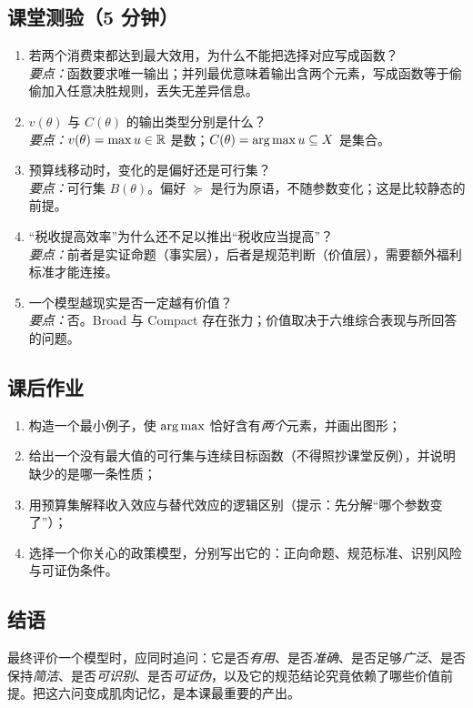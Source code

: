 \subsection{课堂测验（5 分钟）}
\begin{enumerate}
  \item 若两个消费束都达到最大效用，为什么不能把选择对应写成函数？\\
        \emph{要点：}函数要求唯一输出；并列最优意味着输出含两个元素，写成函数等于偷偷加入任意决胜规则，丢失无差异信息。
  \item $v(\theta)$ 与 $C(\theta)$ 的输出类型分别是什么？\\
        \emph{要点：}$v(\theta)=\max u\in\mathbb{R}$ 是数；$C(\theta)=\operatorname*{arg\,max} u\subseteq X$ 是集合。
  \item 预算线移动时，变化的是偏好还是可行集？\\
        \emph{要点：}可行集 $B(\theta)$。偏好 $\succeq$ 是行为原语，不随参数变化；这是比较静态的前提。
  \item “税收提高效率”为什么还不足以推出“税收应当提高”？\\
        \emph{要点：}前者是实证命题（事实层），后者是规范判断（价值层），需要额外福利标准才能连接。
  \item 一个模型越现实是否一定越有价值？\\
        \emph{要点：}否。Broad 与 Compact 存在张力；价值取决于六维综合表现与所回答的问题。
\end{enumerate}

\subsection{课后作业}
\begin{enumerate}
  \item 构造一个最小例子，使 $\operatorname*{arg\,max}$ 恰好含有\emph{两个}元素，并画出图形；
  \item 给出一个没有最大值的可行集与连续目标函数（不得照抄课堂反例），并说明缺少的是哪一条性质；
  \item 用预算集解释收入效应与替代效应的逻辑区别（提示：先分解“哪个参数变了”）；
  \item 选择一个你关心的政策模型，分别写出它的：正向命题、规范标准、识别风险与可证伪条件。
\end{enumerate}

\subsection{结语}

最终评价一个模型时，应同时追问：它是否\emph{有用}、是否\emph{准确}、是否足够\emph{广泛}、是否保持\emph{简洁}、是否\emph{可识别}、是否\emph{可证伪}，以及它的规范结论究竟依赖了哪些价值前提。把这六问变成肌肉记忆，是本课最重要的产出。


